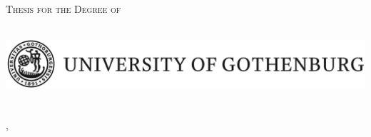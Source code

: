 
\begin{titlepage}
  \centering

  {\scshape Thesis for the Degree of \degree}\\[2cm]
%
  {\Huge \phdtitle}\\[0.3cm]
%
  {\LARGE\scshape \phdauthor}

  \vfill

  \includegraphics[width=\textwidth]{img/GU.png}\\[0.5cm]

\phddepartment\\
\phduniversity\\
\phdcity, \phdcountry ~\phdyear

\end{titlepage}
